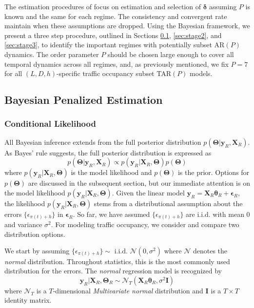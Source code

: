The estimation procedures of \cite{Chan2015,Chan2017} focus on estimation and selection of $\bm{\delta}$ assuming $P$ is known and the same for each regime. The consistency and convergent rate maintain when these assumptions are dropped. Using the Bayesian framework, we present a three step procedure, outlined in Sections \ref{sec:stage1}, \ref{sec:stage2}, and \ref{sec:stage3}, to identify the important regimes with potentially subset AR$(P)$ dynamics. The order parameter $P$ should be chosen large enough to cover all temporal dynamics across all regimes, and, as previously mentioned, we fix $P=7$ for all $(L,D,h)$-specific traffic occupancy subset TAR$(P)$ models.

\subsection{Bayesian Penalized Estimation}
\label{sec:stage1}

\subsubsection{Conditional Likelihood}
All Bayesian inference extends from the full posterior distribution $p(\bm{\Theta}|\bm{y}_R,\bm{X}_R)$. As Bayes' rule suggests, the full posterior distribution is expressed as
\begin{equation}
\label{eq:fullpost}
p(\bm{\Theta}|\bm{y}_R,\bm{X}_R) \propto p(\bm{y}_R|\bm{X}_R,\bm{\Theta})p(\bm{\Theta})
\end{equation}
where $p(\bm{y}_R|\bm{X}_R,\bm{\Theta})$ is the model likelihood and $p(\bm{\Theta})$ is the prior. Options for $p(\bm{\Theta})$ are discussed in the subsequent section, but our immediate attention is on the model likelihood $p(\bm{y}_R|\bm{X}_R,\bm{\Theta})$. Given the linear model $\bm{y}_R=\bm{X}_R\bm{\theta}_R+\bm{\epsilon}_R$, the likelihood $p(\bm{y}_R|\bm{X}_R,\bm{\Theta})$ stems from a distributional assumption about the errors $\{\epsilon_{\pi(t)+h}\}$ in $\bm{\epsilon}_R$. So far, we have assumed $\{\epsilon_{\pi(t)+h}\}$ are i.i.d. with mean $0$ and variance $\sigma^2$. For modeling traffic occupancy, we consider and compare two distribution options.

We start by assuming $\{\epsilon_{\pi(t)+h}\} \sim \textrm{ i.i.d. }\mathcal{N}(0,\sigma^2)$ where $\mathcal{N}$ denotes the \textit{normal} distribution. Throughout statistics, this is the most commonly used distribution for the errors. The \textit{normal} regression model is recognized by 
\begin{equation}
\label{eq:normalmod}
\bm{y}_R|\bm{X}_R,\bm{\Theta}_R\sim \mathcal{N}_T(\bm{X}_R\bm{\theta}_R,\sigma^2\bm{I})
\end{equation}
where $\mathcal{N}_T$ is a $T$-dimensional \textit{Multivariate normal} distribution and $\bm{I}$ is a $T\times T$ identity matrix.

